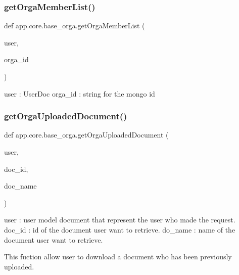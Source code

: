 \subsubsection{\texorpdfstring{get\+Orga\+Member\+List()}{getOrgaMemberList()}}
{\footnotesize\ttfamily def app.\+core.\+base\+\_\+orga.\+get\+Orga\+Member\+List (\begin{DoxyParamCaption}\item[{}]{user,  }\item[{}]{orga\+\_\+id }\end{DoxyParamCaption})}

\begin{DoxyVerb}user : UserDoc
orga_id : string for the mongo id
\end{DoxyVerb}
 \mbox{\label{namespaceapp_1_1core_1_1base__orga_af8f9957c34970929893659a4b5bdb366}} 
\subsubsection{\texorpdfstring{get\+Orga\+Uploaded\+Document()}{getOrgaUploadedDocument()}}
{\footnotesize\ttfamily def app.\+core.\+base\+\_\+orga.\+get\+Orga\+Uploaded\+Document (\begin{DoxyParamCaption}\item[{}]{user,  }\item[{}]{doc\+\_\+id,  }\item[{}]{doc\+\_\+name }\end{DoxyParamCaption})}

\begin{DoxyVerb}user : user model document that represent the user who made the request.
doc_id : id of the document user want to retrieve.
do_name : name of the document user want to retrieve.

This fuction allow user to download a document who has been previously uploaded.
\end{DoxyVerb}
 \mbox{\label{namespaceapp_1_1core_1_1base__orga_a3e303f8a7ab093778a9a731691641cf9}} 
